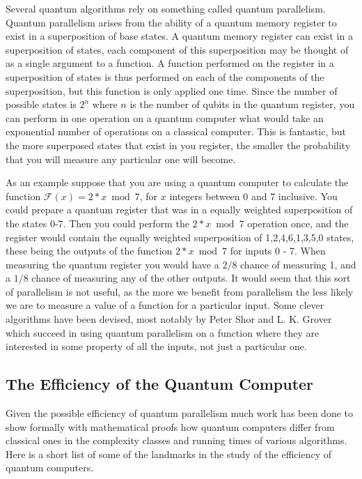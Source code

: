 \documentclass[]{article}
\begin{document}
Several quantum algorithms rely on something called quantum
parallelism.  Quantum parallelism arises from the ability of a quantum
memory register to exist in a superposition of base states.  A quantum
memory register can exist in a superposition of states, each component
of this superposition may be thought of as a single argument to a
function.  A function performed on the register in a superposition of
states is thus performed on each of the components of the
superposition, but this function is only applied one time.  Since the
number of possible states is $2^{n}$ where $n$ is the number of qubits
in the quantum register, you can perform in one operation on a quantum
computer what would take an exponential number of operations on a
classical computer.  This is fantastic, but the more superposed states
that exist in you register, the smaller the probability that you will
measure any particular one will become.

As an example suppose that you are using a quantum computer to
calculate the function $\mathcal{F}(x) = 2*x \bmod 7$, for $x$
integers between 0 and 7 inclusive. You could prepare a quantum
register that was in a equally weighted superposition of the states
0-7. Then you could perform the $2*x \bmod 7$ operation once, and the
register would contain the equally weighted superposition of
1,2,4,6,1,3,5,0 states, these being the outputs of the function $2*x
\bmod 7$ for inputs 0 - 7. When measuring the quantum register you
would have a $2/8$ chance of measuring 1, and a $1/8$ chance of
measuring any of the other outputs. It would seem that this sort of
parallelism is not useful, as the more we benefit from parallelism the
less likely we are to measure a value of a function for a particular
input. Some clever algorithms have been devised, most notably by Peter
Shor and L. K. Grover which succeed in using quantum parallelism on a
function where they are interested in some property of all the inputs,
not just a particular one.

\subsection{The Efficiency of the Quantum Computer}

Given the possible efficiency of quantum parallelism much work has
been done to show formally with mathematical proofs how quantum
computers differ from classical ones in the complexity classes and
running times of various algorithms.  Here is a short list of some of
the landmarks in the study of the efficiency of quantum computers.
\end{document}

